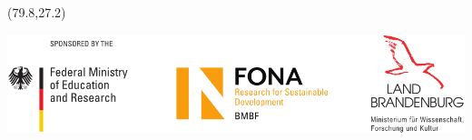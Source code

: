 \documentclass[19pt]{beamer}
\begin{document}
\begin{frame}
%
        \begin{textblock}{20}(79.8,27.2)
            \begin{WhiteBox}
                \vspace{-1cm}
                \begin{block}{}
                    \includegraphics[width=\textwidth]{img/Sponsor_logos}
                \end{block}
            \end{WhiteBox}
        \end{textblock}
    \end{frame}
\end{document}
